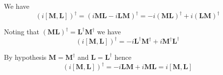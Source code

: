 


\bigskip
We have
\begin{equation*}
(i[\mathbf M,\mathbf L])^\dag=(i\mathbf M\mathbf L-i\mathbf L\mathbf M)^\dag
=-i(\mathbf M\mathbf L)^\dag+i(\mathbf L\mathbf M)^\dag
\end{equation*}

Noting that $(\mathbf M\mathbf L)^\dag=\mathbf L^\dag\mathbf M^\dag$ we have
\begin{equation*}
(i[\mathbf M,\mathbf L])^\dag
=-i\mathbf L^\dag\mathbf M^\dag+i\mathbf M^\dag\mathbf L^\dag
\end{equation*}

By hypothesis $\mathbf M=\mathbf M^\dag$ and $\mathbf L=\mathbf L^\dag$ hence
\begin{equation*}
(i[\mathbf M,\mathbf L])^\dag
=-i\mathbf L\mathbf M+i\mathbf M\mathbf L=i[\mathbf M,\mathbf L]
\end{equation*}


